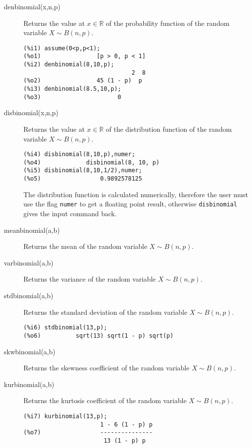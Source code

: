 \documentclass[12pt,a4paper]{article}
\newcommand{\R}{\mathbb{R}}
\begin{document}
\begin{description}

\item[denbinomial(x,n,p)] Returns the value at $x \in \R$ of the probability function of the random variable $X \sim B(n,p)$.

\begin{verbatim}
(%i1) assume(0<p,p<1);
(%o1)                [p > 0, p < 1]
(%i2) denbinomial(8,10,p);
                               2  8
(%o2)                45 (1 - p)  p
(%i3) denbinomial(8.5,10,p);
(%o3)                      0
\end{verbatim}

\item[disbinomial(x,n,p)] Returns the value at $x \in \R$ of the distribution function of the random variable $X \sim B(n,p)$.

\begin{verbatim}
(%i4) disbinomial(8,10,p),numer;
(%o4)             disbinomial(8, 10, p)
(%i5) disbinomial(8,10,1/2),numer;
(%o5)                 0.9892578125
\end{verbatim}
The distribution function is calculated numerically, therefore the user must use the flag \verb|numer| to get a floating point result, otherwise \verb|disbinomial| gives the input command back.

\item[meanbinomial(a,b)] Returns the mean of the random variable  $X \sim B(n,p)$.

\item[varbinomial(a,b)] Returns the variance of the random variable  $X \sim B(n,p)$.

\item[stdbinomial(a,b)] Returns the standard deviation of the random variable  $X \sim B(n,p)$.

\begin{verbatim}
(%i6) stdbinomial(13,p);
(%o6)          sqrt(13) sqrt(1 - p) sqrt(p)
\end{verbatim}

\item[skwbinomial(a,b)] Returns the skewness coefficient of the random variable  $X \sim B(n,p)$.

\item[kurbinomial(a,b)] Returns the kurtosis coefficient of the random variable  $X \sim B(n,p)$.

\begin{verbatim}
(%i7) kurbinomial(13,p);
                      1 - 6 (1 - p) p
(%o7)                 ---------------
                       13 (1 - p) p
\end{verbatim}

\end{description}
\end{document}

